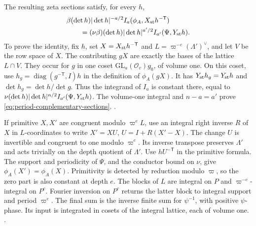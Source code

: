 The resulting zeta sections satisfy, for every \(h\),
\begin{equation}
\label{eq:period-complementary-sections}
 \begin{aligned}
 &\beta(\det h)|\det h|^{-a/2}I_a(\phi_A,X_{\rm st}h^{-\mathsf T})\\
 &\hspace{2em}=(\nu\beta)(\det h)|\det h|^{a'/2}I_{a'}(\Psi,Y_{\rm st}h).
 \end{aligned}
\end{equation}
To prove the identity, fix \(h\), set \(X=X_{\rm st}h^{-\mathsf T}\)
and \(L=\varpi^{-e}(\Lambda')^\vee\), and let \(V\) be the row space
of \(X\). The contributing \(gX\) are exactly the bases of the
lattice \(L\cap V\). They occur for \(g\) in one coset
\(\mathrm{GL}_a(\mathcal O_v)g_0\), of volume one. On this coset,
use \(h_g=\operatorname{diag}(g^{-\mathsf T},I)h\) in the definition
of \(\phi_A(gX)\). It has \(Y_{\rm st}h_g=Y_{\rm st}h\) and
\(\det h_g=\det h/\det g\). Thus the integrand of \(I_a\) is constant
there, equal to
\(\nu(\det h)|\det h|^{n/2}I_{a'}(\Psi,Y_{\rm st}h)\).
The volume-one integral and \(n-a=a'\) prove
\eqref{eq:period-complementary-sections}.
.

If primitive \(X,X'\) are congruent modulo \(\varpi^e L\), use an
integral right inverse \(R\) of \(X\) in \(L\)-coordinates to write
\(X'=XU\), \(U=I+R(X'-X)\). The change \(U\) is invertible and congruent
to one modulo \(\varpi^e\). Its inverse transpose preserves
\(\Lambda'\) and acts trivially on the depth quotient of \(\Lambda'\).
Use \(hU^{-\mathsf T}\) in the primitive formula. The support and
periodicity of \(\Psi\), and the conductor bound on \(\nu\), give
\(\phi_A(X')=\phi_A(X)\). Primitivity is detected by reduction modulo
\(\varpi\), so the zero part is also constant at depth \(e\).
The blocks of \(L\) are integral on \(P\) and \(\varpi^{-e}\)-integral
on \(P^c\). Fourier inversion on \(P^c\) returns the latter block to
integral support and period \(\varpi^e\). The final sum is the inverse
finite sum for \(\psi^{-1}\), with positive \(\psi\)-phase. Its input
is integrated in cosets of the integral lattice, each of volume one.
.

